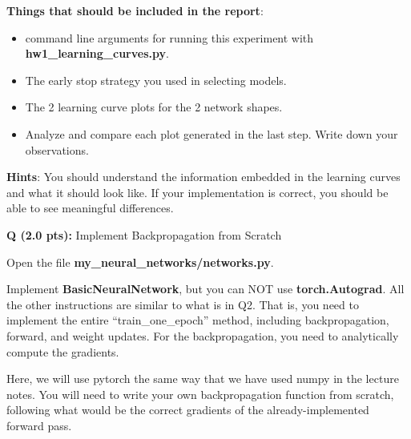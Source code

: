 \documentclass{article}
\newcommand{\homeworknumber}{1}
\newcounter{questionno}
\newcounter{partno}
\newcommand{\question}[1]{
\noindent
\newline
\stepcounter{questionno}
\setcounter{partno}{0}
{\bf Q\arabic{questionno} (#1 pts): }
}
\begin{document}
\noindent \textbf{Things that should be included in the report}:
  \begin{itemize}
    \item command line arguments for running this experiment with \textbf{hw\homeworknumber\_learning\_curves.py}.
    \item The early stop strategy you used in selecting models.
    \item The 2 learning curve plots for the 2 network shapes.
    \item Analyze and compare each plot generated in the last step. Write down
          your observations.
  \end{itemize}

\noindent \textbf{Hints}: You should understand the information embedded in
    the learning curves and what it should look like. If your implementation
    is correct, you should be able to see meaningful differences.



\newpage
\question{2.0}{Implement Backpropagation from Scratch}

\noindent Open the file \textbf{my\_neural\_networks/networks.py}.

\hfill

\noindent Implement \textbf{BasicNeuralNetwork}, but you can NOT use \textbf{torch.Autograd}. All the other instructions are similar to what is in Q2. That is, you need to implement the entire ``train\_one\_epoch'' method, including backpropagation, forward, and weight updates. For the backpropagation, you need to analytically compute the gradients.

Here, we will use pytorch the same way that we have used numpy in the lecture notes. You will need to write your own backpropagation function from scratch, following what would be the correct gradients of the already-implemented forward pass.

\hfill
\end{document}
